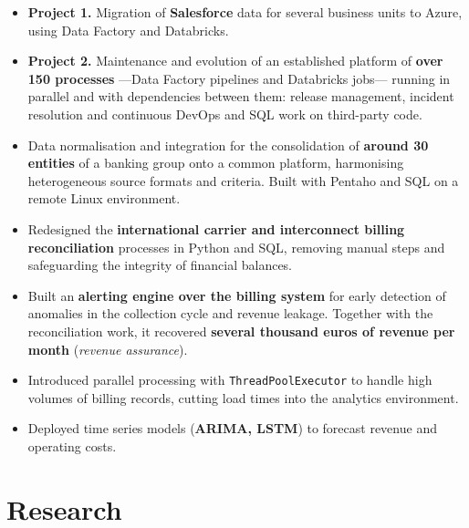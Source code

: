 \documentclass[10pt]{article}
\begin{document}
\begin{itemize}
    \item \textbf{Project 1.} Migration of \textbf{Salesforce} data for several business units to Azure, using Data Factory and Databricks.
    \item \textbf{Project 2.} Maintenance and evolution of an established platform of \textbf{over 150 processes} —Data Factory pipelines and Databricks jobs— running in parallel and with dependencies between them: release management, incident resolution and continuous DevOps and SQL work on third-party code.
\end{itemize}

\begin{itemize}
    \item Data normalisation and integration for the consolidation of \textbf{around 30 entities} of a banking group onto a common platform, harmonising heterogeneous source formats and criteria. Built with Pentaho and SQL on a remote Linux environment.
\end{itemize}

\vspace{0.3cm}
\begin{itemize}
    \item Redesigned the \textbf{international carrier and interconnect billing reconciliation} processes in Python and SQL, removing manual steps and safeguarding the integrity of financial balances.
    \item Built an \textbf{alerting engine over the billing system} for early detection of anomalies in the collection cycle and revenue leakage. Together with the reconciliation work, it recovered \textbf{several thousand euros of revenue per month} (\textit{revenue assurance}).
    \item Introduced parallel processing with \verb|ThreadPoolExecutor| to handle high volumes of billing records, cutting load times into the analytics environment.
    \item Deployed time series models (\textbf{ARIMA, LSTM}) to forecast revenue and operating costs.
\end{itemize}

\section{Research}
\end{document}

